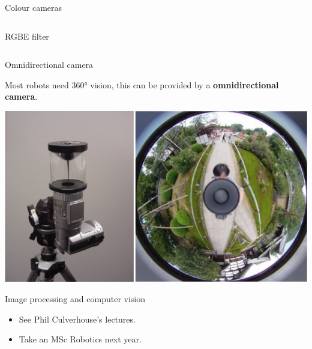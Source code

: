 \documentclass[compress]{beamer}
\begin{document}
\begin{frame}{Colour cameras}
{\begin{columns}
\begin{column}{0.5\linewidth}
\begin{center}
                RGBE filter
                \end{center}

            \end{column}
        \end{columns}

    }
\end{frame}

\begin{frame}{Omnidirectional camera}

              Most robots need 360° vision, this can be provided by a
              \textbf{omnidirectional camera}.

    \begin{center}
        \includegraphics[width=0.8\linewidth]{omni}
    \end{center}
\end{frame}

\begin{frame}{Image processing and computer vision}

    \begin{itemize}

        \item
              See Phil Culverhouse's lectures.
        \item
              Take an MSc Robotics next year.
    \end{itemize}

\end{frame}
\end{document}

